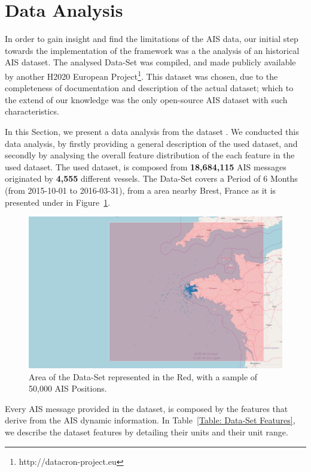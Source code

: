 \section{Data Analysis}
\label{section: Data Analysis}
In order to gain insight and find the limitations of the AIS data, our initial step towards the implementation of the framework was a the analysis of an historical AIS dataset. The analysed Data-Set was compiled, and made publicly available by another H2020 European Project\footnote{http://datacron-project.eu}. 
This dataset was chosen, due to the completeness of documentation and description of the actual dataset; which to the extend of our knowledge was the only open-source AIS dataset with such characteristics.  

In this Section, we present a data analysis from the dataset \cite{DATASET}. We conducted this data analysis, by firstly providing a general description of the used dataset, and secondly by analysing the overall feature distribution of the each feature in the used dataset.
The used dataset, is composed from \textbf{18,684,115} AIS messages originated by \textbf{4,555} different vessels. The Data-Set covers a Period of 6 Months (from 2015-10-01 to 2016-03-31), from a area nearby Brest, France as it is presented under in Figure~\ref{fig:DS_Sample}.

\begin{figure}[H]
\centering
\includegraphics[width=\textwidth]{figures/Ch4/nari_DS_ex2.png}
\caption{Area of the Data-Set represented in the Red, with a sample of 50,000 AIS Positions.}
\label{fig:DS_Sample}
\end{figure}

Every AIS message provided in the dataset, is composed by the features that derive from the AIS dynamic information. In Table~\ref{Table: Data-Set Features}, we describe the dataset features by detailing their units and their unit range. 

